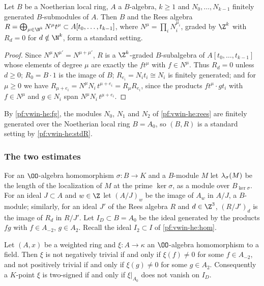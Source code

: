 \begin{lemma}\label{pf:vwin-he:stdR}
Let $B$ be a Noetherian local ring, $A$ a $B$-algebra, $k\ge1$ and $N_0,\dots,N_{k-1}$ finitely generated
$B$-submodules of $A$. Then $B$ and the Rees algebra $R=\bigoplus_{\mu\in\N^k}N^\mu t^\mu\subset
A[t_0,\dots,t_{k-1}]$, where $N^\mu=\prod_iN_i^{\mu_i}$, graded by $\Z^k$ with $R_d=0$ for $d\notin\N^k$, form a
standard setting.
\end{lemma}

\begin{proof}
Since $N^\mu N^{\mu'}=N^{\mu+\mu'}$, $R$ is a $\Z^k$-graded $B$-subalgebra of $A[t_0,\dots,t_{k-1}]$ whose elements
of degree $\mu$ are exactly the $ft^\mu$ with $f\in N^\mu$. Thus $R_d=0$ unless $d\ge0$; $R_0=B\cdot1$ is the image of
$B$; $R_{e_i}=N_it_i\cong N_i$ is finitely generated; and for $\mu\ge0$ we have
$R_{\mu+e_i}=N^{\mu}N_i\,t^{\mu+e_i}=R_\mu R_{e_i}$, since the products $ft^\mu\cdot gt_i$ with $f\in N^\mu$ and
$g\in N_i$ span $N^\mu N_i\,t^{\mu+e_i}$.
\end{proof}

By \cref{pf:vwin-he:fg}, the modules $N_0$, $N_1$ and $N_2$ of \cref{pf:vwin-he:rees} are finitely generated over the
Noetherian local ring $B=A_0$, so $(B,R)$ is a standard setting by \cref{pf:vwin-he:stdR}.

\subsubsection{The two estimates}

For an $\OO$-algebra homomorphism $\sigma:B\to K$ and a $B$-module $M$ let $\lambda_\sigma(M)$ be the length of
the localization of $M$ at the prime $\ker\sigma$, as a module over $B_{\ker\sigma}$. For an ideal $J\subset A$ and
$w\in\Z$ let $(A/J)_w$ be the image of $A_w$ in $A/J$, a $B$-module; similarly, for an ideal $J'$ of the Rees algebra
$R$ and $d\in\Z^3$, $(R/J')_d$ is the image of $R_d$ in $R/J'$. Let $I_D\subset B=A_0$ be the ideal generated by
the products $fg$ with $f\in A_{-2}$, $g\in A_2$. Recall the ideal $I_2\subset I$ of \cref{pf:vwin-he:hom}.

\begin{lemma}\label{pf:vwin-he:sign}
Let $(A,x)$ be a weighted ring and $\xi:A\to\kappa$ an $\OO$-algebra homomorphism to a field. Then $\xi$ is not
negatively trivial if and only if $\xi(f)\ne0$ for some $f\in A_{-2}$, and not positively trivial if and only if
$\xi(g)\ne0$ for some $g\in A_2$. Consequently a $K$-point $\xi$ is two-signed if and only if $\xi|_{A_0}$ does not
vanish on $I_D$.
\end{lemma}

